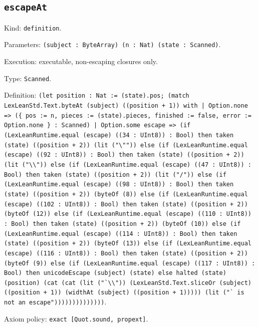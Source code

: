 \documentclass[11pt]{article}
\begin{document}
\subsection*{\texttt{escapeAt}}
\noindent Kind: \texttt{definition}.\par
\noindent Parameters: \texttt{(subject : ByteArray) (n : Nat) (state : Scanned)}.\par
\noindent Execution: executable, non-escaping closures only.\par
\noindent Type: \texttt{Scanned}.\par
\noindent Definition: \texttt{(let position : Nat := (state).pos; (match LexLeanStd.Text.byteAt (subject) ((position + 1)) with | Option.none => (\{ pos := n, pieces := (state).pieces, finished := false, error := Option.none \} : Scanned) | Option.some escape => (if (LexLeanRuntime.equal (escape) ((34 : UInt8)) : Bool) then taken (state) ((position + 2)) (lit ("\textbackslash{}"")) else (if (LexLeanRuntime.equal (escape) ((92 : UInt8)) : Bool) then taken (state) ((position + 2)) (lit ("\textbackslash{}\textbackslash{}")) else (if (LexLeanRuntime.equal (escape) ((47 : UInt8)) : Bool) then taken (state) ((position + 2)) (lit ("/")) else (if (LexLeanRuntime.equal (escape) ((98 : UInt8)) : Bool) then taken (state) ((position + 2)) (byteOf (8)) else (if (LexLeanRuntime.equal (escape) ((102 : UInt8)) : Bool) then taken (state) ((position + 2)) (byteOf (12)) else (if (LexLeanRuntime.equal (escape) ((110 : UInt8)) : Bool) then taken (state) ((position + 2)) (byteOf (10)) else (if (LexLeanRuntime.equal (escape) ((114 : UInt8)) : Bool) then taken (state) ((position + 2)) (byteOf (13)) else (if (LexLeanRuntime.equal (escape) ((116 : UInt8)) : Bool) then taken (state) ((position + 2)) (byteOf (9)) else (if (LexLeanRuntime.equal (escape) ((117 : UInt8)) : Bool) then unicodeEscape (subject) (state) else halted (state) (position) (cat (cat (lit ("`\textbackslash{}\textbackslash{}")) (LexLeanStd.Text.sliceOr (subject) ((position + 1)) (widthAt (subject) ((position + 1))))) (lit ("` is not an escape"))))))))))))))}.\par
\noindent Axiom policy: \texttt{exact [Quot.sound, propext]}.\par
\end{document}
